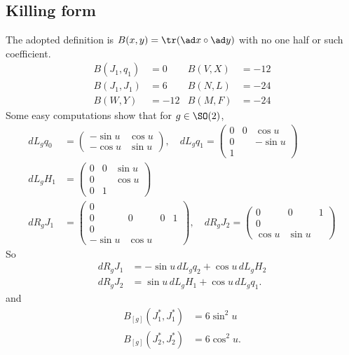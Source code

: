\subsection{Killing form}
The adopted definition is $B(x,y)=\tr(\ad x\circ\ad y)$ with no one half or such coefficient.
\begin{equation}
	\begin{aligned}
		B(J_1,q_1) & =0   & B(V,X) & =-12 \\
		B(J_1,J_1) & =6   & B(N,L) & =-24 \\
		B(W,Y)     & =-12 & B(M,F) & =-24
	\end{aligned}
\end{equation}
Some easy computations show that for $g\in \SO(2)$,
\[
	\begin{split}
		dL_gq_0&=
		\begin{pmatrix}
			-\sin u & \cos u \\
			-\cos u & \sin u
		\end{pmatrix},
		\quad
		dL_g q_1=
		\begin{pmatrix}
			0 & 0 & \cos u  \\
			0 &   & -\sin u \\
			1
		\end{pmatrix}\\
		dL_g H_1&=
		\begin{pmatrix}
			0 & 0 & \sin u \\
			0 &   & \cos u \\
			0 & 1
		\end{pmatrix}\\
		dR_g J_1&=
		\begin{pmatrix}
			0                        \\
			0       & 0      & 0 & 1 \\
			0                        \\
			-\sin u & \cos u
		\end{pmatrix},
		\quad
		dR_g J_2=
		\begin{pmatrix}
			0      & 0      & 1 \\
			0                   \\
			\cos u & \sin u
		\end{pmatrix}
	\end{split}
\]
So
\begin{subequations}
	\begin{align}
		dR_g J_1 & =-\sin u\, dL_g q_2+\cos u\, dL_g H_2 \\
		dR_g J_2 & =\sin u\, dL_g H_1+\cos u\, dL_g q_1.
	\end{align}
\end{subequations}
and
\begin{subequations}
	\begin{align}
		B_{[g]}(J_1^*,J_1^*) & =6\sin^2 u  \\
		B_{[g]}(J_2^*,J_2^*) & =6\cos^2 u.
	\end{align}
\end{subequations}


